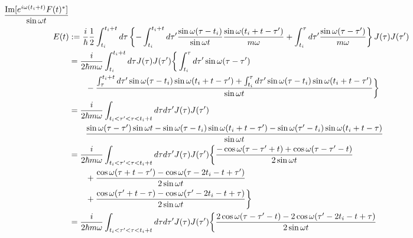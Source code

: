 \begin{subequations}
\begin{align}
    \dfrac{
        \Im[ e^{i \omega (t_i + t)} F(t)^* ]
    }{\sin \omega t}
\\
    E(t)
    &:=
    \dfrac{i}{\hbar}
    \dfrac{1}{2}
    \int_{t_i}^{t_i + t} d\tau
    \left\{
    -
    \int_{t_i}^{t_i + t} d\tau'
        \dfrac{\sin \omega (\tau - t_i)}{\sin \omega t}
        \dfrac{\sin \omega (t_i + t - \tau')}{m \omega}
    +
    \int_{t_i}^{\tau} d\tau'
        \dfrac{\sin \omega (\tau - \tau')}{m \omega}
    \right\}
    J(\tau) J(\tau')
\notag\\&
    =
    \dfrac{i}{2 \hbar m \omega}
    \int_{t_i}^{t_i + t} d\tau
    J(\tau) J(\tau')
    \bigg\{
    \int_{t_i}^{\tau} d\tau'
        \sin \omega (\tau - \tau')
\notag\\&\qquad
    -
    \dfrac{
        \int_{\tau}^{t_i + t} d\tau'
            \sin \omega (\tau - t_i)
            \sin \omega (t_i + t - \tau')
    +
        \int_{t_i}^{\tau} d\tau'
            \sin \omega (\tau - t_i)
            \sin \omega (t_i + t - \tau')
    }{\sin \omega t}
    \bigg\}
\notag\\&
    =
    \dfrac{i}{2 \hbar m \omega}
    \int_{t_i < \tau' < \tau < t_i + t}
        d\tau d\tau'
    J(\tau) J(\tau')
\notag\\&\qquad
    \dfrac{
            \sin \omega (\tau - \tau')
            \sin \omega t
        -
            \sin \omega (\tau - t_i)
            \sin \omega (t_i + t - \tau')
        -
            \sin \omega (\tau' - t_i)
            \sin \omega (t_i + t - \tau)
    }{\sin \omega t}
\notag\\&
    =
    \dfrac{i}{2 \hbar m \omega}
    \int_{t_i < \tau' < \tau < t_i + t}
        d\tau d\tau'
    J(\tau) J(\tau')
    \bigg\{
    \dfrac{
        -
            \cos \omega (\tau - \tau' + t)
        +
            \cos \omega (\tau - \tau' - t)
    }{2 \sin \omega t}
\notag\\&\qquad
    +
    \dfrac{
            \cos \omega (\tau + t - \tau')
        -
            \cos \omega (\tau - 2 t_i - t + \tau')
    }{2 \sin \omega t}
\notag\\&\qquad
    +
    \dfrac{
            \cos \omega (\tau' + t - \tau)
        -
            \cos \omega (\tau' - 2 t_i - t + \tau)
    }{2 \sin \omega t}
    \bigg\}
\notag\\&
    =
    \dfrac{i}{2 \hbar m \omega}
    \int_{t_i < \tau' < \tau < t_i + t}
        d\tau d\tau'
    J(\tau) J(\tau')
    \bigg\{
    \dfrac{
            2 \cos \omega (\tau - \tau' - t)
        -
            2 \cos \omega (\tau' - 2 t_i - t + \tau)
    }{2 \sin \omega t}

\end{align}
\end{subequations}
